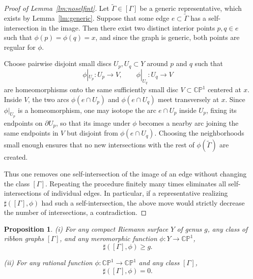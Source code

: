 \documentclass[reqno]{amsart}
\newtheorem{proposition}[theorem]{Proposition}
\theoremstyle{definition}
\newcommand {\Ga}{\Gamma}
\newcommand {\bCP} {\mathbb {CP}}
\begin{document}
\begin{proof}[Proof of Lemma~\ref{lm:noselfint}]
Let $\widetilde\Gamma\in[\Gamma]$ be a generic representative, which exists by Lemma~\ref{lm:generic}.
 Suppose that some edge $e\subset \widetilde\Ga$ has a self-intersection in the image. Then there exist two distinct interior points $p,q\in e$ such that $\phi(p)=\phi(q)=x$, and since the graph is generic, both points are regular for $\phi$.

Choose pairwise disjoint small discs $U_p,U_q\subset Y$ around $p$ and $q$ such that
\[
\phi|_{U_p}:U_p\to V,\qquad \phi|_{U_q}:U_q\to V
\]
are homeomorphisms onto the same sufficiently small disc $V\subset \bCP^1$ centered at $x$. Inside $V$, the two arcs $\phi(e\cap U_p)$ and $\phi(e\cap U_q)$ meet transversely at $x$. Since $\phi|_{U_p}$ is a homeomorphism, one may isotope the arc $e\cap U_p$ inside $U_p$, fixing its endpoints on $\partial U_p$, so that its image under $\phi$ becomes a nearby arc joining the same endpoints in $V$ but disjoint from $\phi(e\cap U_q)$. Choosing the neighborhoods small enough ensures that no new intersections with the rest of $\phi(\widetilde\Ga)$ are created.

Thus one removes one self-intersection of the image of an edge without changing the class $[\Ga]$. Repeating the procedure finitely many times eliminates all self-intersections of individual edges. In particular, if a representative realizing $\sharp([\Ga],\phi)$ had such a self-intersection, the above move would strictly decrease the number of intersections, a contradiction.
\end{proof}


\begin{proposition}\label{pr:im}
\rm
(i) For any compact Riemann surface $Y$ of genus $g$, any class of ribbon graphs $[\Ga]$, and any meromorphic function $\phi:Y\to \bCP^1$,
\[
\sharp([\Ga],\phi)\ge g.
\]

\smallskip
\noindent
(ii) For any rational function $\phi:\bCP^1\to \bCP^1$ and any class $[\Ga]$,
\[
\sharp([\Ga],\phi)=0.
\]
\end{proposition}
\end{document}
